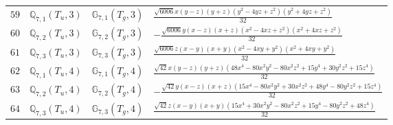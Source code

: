 \documentclass[fleqn,8pt,landscape]{jsarticle}
\begin{document}
\begin{table}[ht!]
\begin{center}
\begin{tabular}{cccl}
$ 59 $ & $ \mathbb{Q}_{7,1}(T_{u},3) $ & $ \mathbb{G}_{7,1}(T_{g},3) $ & $ \frac{\sqrt{6006} x \left(y - z\right) \left(y + z\right) \left(y^{2} - 4 y z + z^{2}\right) \left(y^{2} + 4 y z + z^{2}\right)}{32} $ \\
$ 60 $ & $ \mathbb{Q}_{7,2}(T_{u},3) $ & $ \mathbb{G}_{7,2}(T_{g},3) $ & $ - \frac{\sqrt{6006} y \left(x - z\right) \left(x + z\right) \left(x^{2} - 4 x z + z^{2}\right) \left(x^{2} + 4 x z + z^{2}\right)}{32} $ \\
$ 61 $ & $ \mathbb{Q}_{7,3}(T_{u},3) $ & $ \mathbb{G}_{7,3}(T_{g},3) $ & $ \frac{\sqrt{6006} z \left(x - y\right) \left(x + y\right) \left(x^{2} - 4 x y + y^{2}\right) \left(x^{2} + 4 x y + y^{2}\right)}{32} $ \\
$ 62 $ & $ \mathbb{Q}_{7,1}(T_{u},4) $ & $ \mathbb{G}_{7,1}(T_{g},4) $ & $ \frac{\sqrt{42} x \left(y - z\right) \left(y + z\right) \left(48 x^{4} - 80 x^{2} y^{2} - 80 x^{2} z^{2} + 15 y^{4} + 30 y^{2} z^{2} + 15 z^{4}\right)}{32} $ \\
$ 63 $ & $ \mathbb{Q}_{7,2}(T_{u},4) $ & $ \mathbb{G}_{7,2}(T_{g},4) $ & $ - \frac{\sqrt{42} y \left(x - z\right) \left(x + z\right) \left(15 x^{4} - 80 x^{2} y^{2} + 30 x^{2} z^{2} + 48 y^{4} - 80 y^{2} z^{2} + 15 z^{4}\right)}{32} $ \\
$ 64 $ & $ \mathbb{Q}_{7,3}(T_{u},4) $ & $ \mathbb{G}_{7,3}(T_{g},4) $ & $ \frac{\sqrt{42} z \left(x - y\right) \left(x + y\right) \left(15 x^{4} + 30 x^{2} y^{2} - 80 x^{2} z^{2} + 15 y^{4} - 80 y^{2} z^{2} + 48 z^{4}\right)}{32} $ \\
 \hline \hline
\end{tabular}
\end{center}
\end{table}
\end{document}
